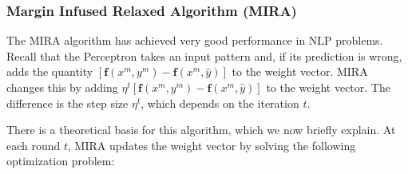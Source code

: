 \subsubsection{Margin Infused Relaxed Algorithm (MIRA)}

The MIRA algorithm \citep{Crammer2002,Crammer2006}  has achieved very good performance in NLP problems. Recall that the Perceptron takes an input pattern and, if its prediction is wrong, adds the quantity $[\boldsymbol{f}(x^m,y^m) - \boldsymbol{f}(x^m,\hat{y})]$ to the weight vector. MIRA changes this by adding $\eta^t[\boldsymbol{f}(x^m,y^m) - \boldsymbol{f}(x^m,\hat{y})]$ to the weight vector. The difference is the step size $\eta^t$, which depends on the iteration $t$.

There is a theoretical basis for this algorithm, which we now briefly explain. At each round $t$, MIRA updates the weight vector by solving the following optimization problem: 

